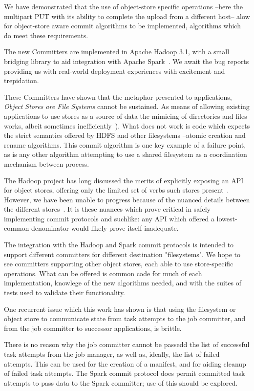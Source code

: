 \documentclass[conference]{IEEEtran}
\begin{document}
We have demonstrated that the use of object-store specific operations --here
the multipart PUT with its ability to complete the upload from a different host--
alow for object-store aware commit algorithms to be implemented,
algorithms which do meet these requirements.

The new Committers are implemented in Apache Hadoop 3.1, with a small bridging
library to aid integration with Apache Spark\ \cite{HADOOP-13786}.
We await the bug reports providing us with real-world deployment experiences
with excitement and trepidation.


These Committers have shown that the metaphor presented to applications,
\emph{Object Stores are File Systems} cannot be sustained.
As means of allowing existing applications to use stores as a source
of data the mimicing of directories and files works, albeit sometimes
inefficiently\ \cite{HADOOP-13208}).
What does not work is code which expects the strict semantics
offered by HDFS and other filesystems --atomic creation and rename algorithms.
This commit algorithm is one key example of a failure point, as
is any other algorithm attempting to use a shared filesystem
as a coordination mechanism between process.

The Hadoop project has long discussed the merits of explicitly
exposing an API for object stores, offering only the limited
set of verbs such stores present\ \cite{HADOOP-9565}.
However, we have been unable to progress because of the nuanced details
between the different stores\ \cite{S3, WASB, ADL, GCS}.
It is these nuances which prove critical in safely implementing
commit protocols and suchlike: any API which offered a lowest-common-denominator
would likely prove itself inadequate.

The integration with the Hadoop and Spark commit protocols is intended
to support different committers for different destination "filesystems".
We hope to see committers supporting other object stores, each
able to use store-specific operations.
What can be offered is common code for much of each implementation,
knowlege of the new algorithms needed, and
with the suites of tests used to validate their functionality.

One recurrent issue which this work has shown is that using the
filesystem or object store to communicate state from task attempts
to the job committer, and from the job committer to successor
applications, is brittle.

There is no reason why the job committer cannot be passedd the list of
successful task attempts from the job manager, as well as, ideally,
the list of failed attempts.
This can be used for the creation of a manifest, and for aiding cleanup
of failed task attempts.
The Spark commit protocol does permit committed task attempts to pass data
to the Spark committer;
use of this should be explored.
\end{document}
